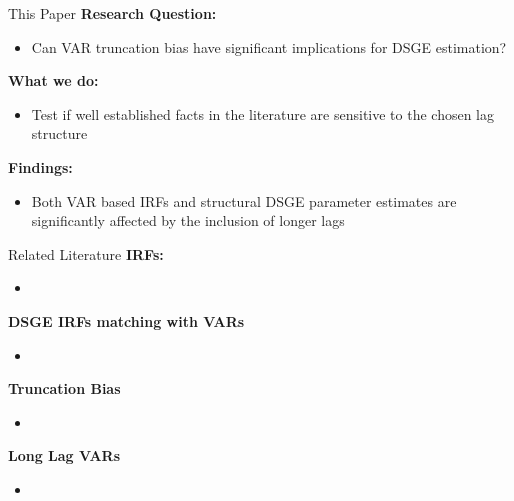 \documentclass[11pt]{beamer}
\begin{document}

\begin{frame}{This Paper}\label{slide:this_paper}
    \textbf{Research Question:}
    \begin{itemize}
        \item \textcolor{PadovaRed}{Can VAR truncation bias have significant implications for DSGE estimation?}
    \end{itemize}
    
    \vspace{0.4cm}
    \textbf{What we do:}
    \begin{itemize}
        \item Test if well established facts in the literature are sensitive to the chosen lag structure
    \end{itemize}
    \pause
    
    \vspace{0.4cm}    
    \textbf{Findings:}
    \begin{itemize}
        \item Both VAR based IRFs and structural DSGE parameter estimates are significantly affected by the inclusion of longer lags
    \end{itemize}
    \begin{center}
        \hyperlink{slide:var_irfs}{} \quad
        \hyperlink{slide:dsge_irfs}{} \quad
        \hyperlink{slide:dsge_params}{}
    \end{center}
\end{frame}


\begin{frame}{Related Literature}
    \textbf{IRFs:}
    \begin{itemize}
        \item \citep{Moller_Wolf2021, Ludwig2026}
    \end{itemize}
    \textbf{DSGE IRFs matching with VARs}
    \begin{itemize}
        \item \citep{CEE2005, ACEL2011, Jarocinski_Karadi2020}
    \end{itemize}
    \textbf{Truncation Bias}
    \begin{itemize}
        \item \citep{Long_Lag2025, Baumeister2025}
    \end{itemize}
    \textbf{Long Lag VARs}
    \begin{itemize}
        \item \citep{Antolin-Diaz_Surico2025}
    \end{itemize}
\end{frame}
\end{document}
